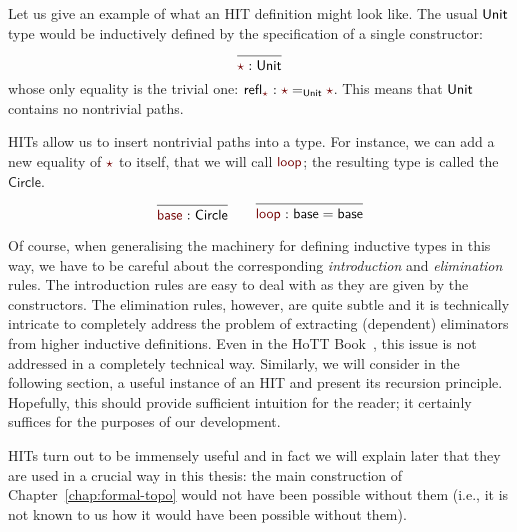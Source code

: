 Let us give an example of what an HIT definition might look like. The usual $\mathsf{Unit}{}$
type would be inductively defined by the specification of a single constructor:
\begin{equation*}
  \begin{prooftree}
    \infer0{\oftyI{\rulename{\star}}{\unitty{}}}
  \end{prooftree}
\end{equation*}
whose only equality is the trivial one:
$\oftyI{\mathsf{refl}_{\rulename{\star}}}{\rulename{\star} =_{\unitty{}} \rulename{\star}}$. This means
that $\mathsf{Unit}{}$ contains no nontrivial paths.

HITs allow us to insert nontrivial paths into a type. For instance, we can add a new
equality of $\rulename{\star}$ to itself, that we will call $\rulename{loop}$; the resulting
type is called the $\mathsf{Circle}$.
\begin{equation*}
  \begin{prooftree}
    \infer0[]{\oftyI{\rulename{base}}{\mathsf{Circle}}}
  \end{prooftree}
  \hspace{2em}
  \begin{prooftree}
    \infer0[]{\oftyI{\rulename{loop}}{\mathsf{base} = \mathsf{base}}}
  \end{prooftree}
\end{equation*}

Of course, when generalising the machinery for defining inductive types in this way, we
have to be careful about the corresponding \emph{introduction} and \emph{elimination}
rules. The introduction rules are easy to deal with as they are given by the constructors.
The elimination rules, however, are quite subtle and it is technically intricate to
completely address the problem of extracting (dependent) eliminators from higher inductive
definitions. Even in the HoTT Book~\cite[Sec.~6.2]{hottbook}, this issue is not addressed
in a completely technical way. Similarly, we will consider in the following section, a
useful instance of an HIT and present its recursion principle. Hopefully, this should
provide sufficient intuition for the reader; it certainly suffices for the purposes of
our development.

HITs turn out to be immensely useful and in fact we will explain later that they are used
in a crucial way in this thesis: the main construction of Chapter~\ref{chap:formal-topo}
would not have been possible without them (i.e., it is not known to us how it would have
been possible without them).

